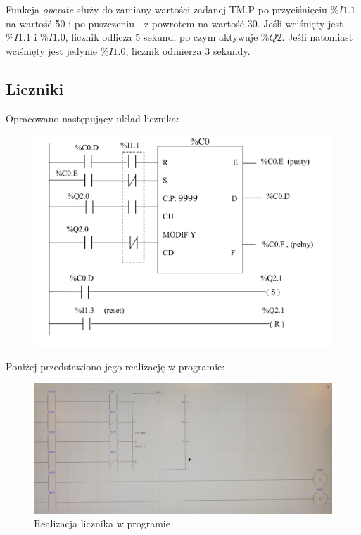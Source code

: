\documentclass[12pt]{article}
\begin{document}
Funkcja \textit{operate} służy do zamiany wartości zadanej TM.P po przyciśnięciu $\%I1.1$ na wartość 50 i po puszczeniu - z powrotem na wartość 30. Jeśli wciśnięty jest $\%I1.1$ i $\%I1.0$, licznik odlicza 5 sekund, po czym aktywuje $\%Q2$. Jeśli natomiast wciśnięty jest jedynie $\%I1.0$, licznik odmierza 3 sekundy.


\subsection{Liczniki}

Opracowano następujący układ licznika:
\begin{figure}[H]
    \centering
    \includegraphics[scale=0.35]{licznik.png}
    \caption{}
\end{figure}

Poniżej przedstawiono jego realizację w programie:
\begin{figure}[H]
    \centering
    \includegraphics[width=\textwidth]{licznik_zdj.jpg}
    \caption{Realizacja licznika w programie}
\end{figure}
\end{document}
